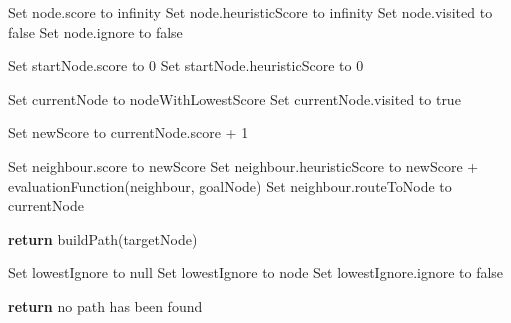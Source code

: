\documentclass{article}
\begin{document}
\begin{algorithm}
\begin{algorithmic}


    \State Set node.score to infinity 
    \State Set node.heuristicScore to infinity
    \State Set node.visited to false
    \State Set node.ignore to false
\EndFor

\State Set startNode.score to 0
\State Set startNode.heuristicScore to 0 \newline


    \State Set currentNode to nodeWithLowestScore
    \State Set currentNode.visited to true \newline


            \State Set newScore to currentNode.score + 1
            
                \State Set neighbour.score to newScore
                \State Set neighbour.heuristicScore to newScore + evaluationFunction(neighbour, goalNode)
                \State Set neighbour.routeToNode to currentNode 
                
            \EndIf      
        \EndIf
    \EndFor \newline

        \State \textbf{return} buildPath(targetNode)
    \EndIf \newline

    \State Set lowestIgnore to null
                \State Set lowestIgnore to node
            \EndIf        
         \EndFor 
        \State Set lowestIgnore.ignore to false \newline

            \textbf{return} no path has been found
        \EndIf \newline
    
        
    \EndIf \newline

\EndWhile
\EndProcedure \newline


\end{algorithmic}
\end{algorithm}
\end{document}
